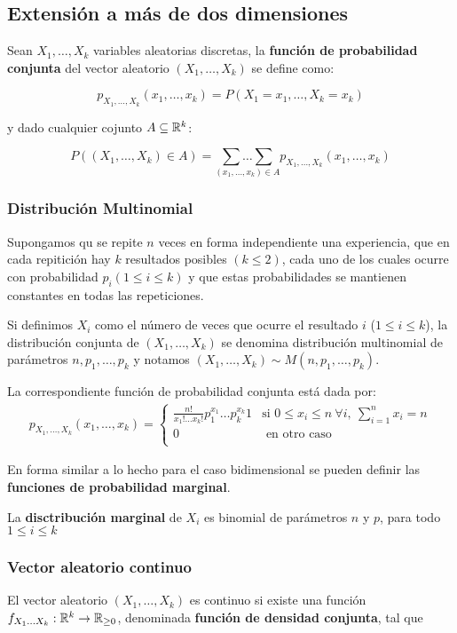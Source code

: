 \subsection{Extensión a más de dos dimensiones}
Sean $X_1,\dots,X_k$ variables aleatorias discretas, la \textbf{función de probabilidad conjunta} del vector aleatorio $(X_1,\dots,X_k)$ se define como:

$$p_{X_1,\dots,X_k}(x_1,\dots,x_k) = P(X_1 = x_1,\dots, X_k = x_k)$$

y dado cualquier cojunto $A\subseteq\mathbb{R}^k$:

$$P((X_1,\dots,X_k)\in A) = \underset{(x_1,\dots,x_k)\in A}{\sum\dots\sum} p_{X_1,\dots,X_k}(x_1,\dots,x_k)$$

\subsubsection{Distribución Multinomial}
Supongamos qu se repite $n$ veces en forma independiente una experiencia, que en cada repitición hay $k$ resultados posibles $(k \leq 2)$, cada uno de los cuales ocurre con probabilidad $p_i (1\leq i \leq k)$ y que estas probabilidades se mantienen constantes en todas las repeticiones.

Si definimos $X_i$ como el número de veces que ocurre el resultado $i$ ($1\leq i\leq k$), la distribución conjunta de $(X_1,\dots,X_k)$ se denomina distribución multinomial de parámetros $n, p_1,\dots, p_k$ y notamos $(X_1,\dots,X_k)\sim M(n, p_1,\dots, p_k)$.

La correspondiente función de probabilidad conjunta está dada por:
\begin{align*}
p_{X_1,\dots,X_k}(x_1,\dots,x_k) = \left\{\begin{array}{ll}
\frac{n!}{x_1!\dots x_k!}p_1^{x_1}\dots p_k^{x_k} 1& \text{si } 0 \leq x_i \leq n~\forall i,~\sum_{i=1}^{n} x_i = n\\
0 & \text{ en otro caso}\\
\end{array}\right.
\end{align*}

En forma similar a lo hecho para el caso bidimensional se pueden definir las \textbf{funciones de probabilidad marginal}.

La \textbf{disctribución marginal} de $X_i$ es binomial de parámetros $n$ y $p$, para todo $1\leq i \leq k$



\subsubsection{Vector aleatorio continuo}
El vector aleatorio $(X_1,\dots,X_k)$ es continuo si existe una función $f_{X_1\dots X_k}:\mathbb{R}^k\to\mathbb{R}_{\geq 0}$, denominada \textbf{función de densidad conjunta}, tal que

